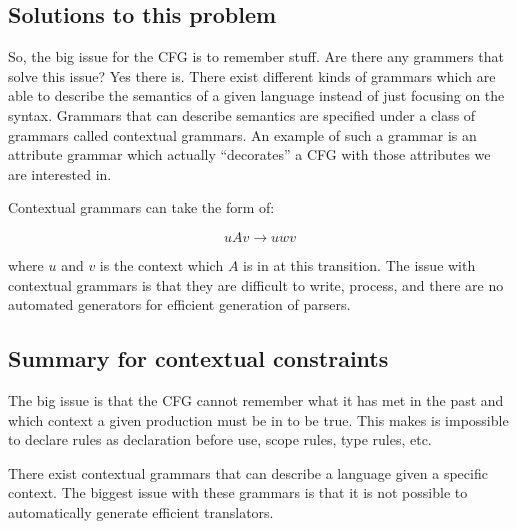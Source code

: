 \subsection{Solutions to this problem}
So, the big issue for the CFG is to remember stuff. Are there any grammers that
solve this issue? Yes there is. There exist different kinds of grammars which
are able to describe the semantics of a given language instead of just focusing
on the syntax. Grammars that can describe semantics are specified under a class
of grammars called contextual grammars.
\cite{plpp}
An example of such a grammar is an attribute grammar which actually
``decorates'' a CFG with those attributes we are interested in.
\cite{attrgrammar}

Contextual grammars can take the form of:

\[
  uAv \rightarrow uwv
\]

where $u$ and $v$ is the context which $A$ is in at this transition. The issue
with contextual grammars is that they are difficult to write, process, and there 
are no automated generators for efficient generation of parsers.
\cite{attrgrammar}





\subsection{Summary for contextual constraints}
The big issue is that the CFG cannot remember what it has met in the past and
which context a given production must be in to be true. This makes is impossible
to declare rules as declaration before use, scope rules, type rules, etc.

There exist contextual grammars that can describe a language given a specific
context. The biggest issue with these grammars is that it is not possible to
automatically generate efficient translators.

